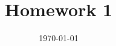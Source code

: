\documentclass[12pt]{article}
\begin{document}
 
\title{Homework 1}
\date{\today}
\maketitle


 
 
    
    \newpage
\end{document}
